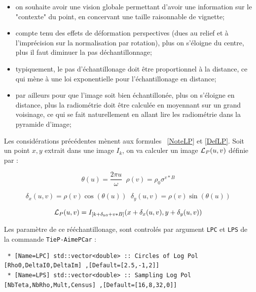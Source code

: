 \begin{itemize}
   \item on souhaite avoir une vision globale permettant d'avoir une information sur le "contexte"  du 
         point, en concervant une taille raisonnable de  vignette;

   \item compte tenu des effets de d\'eformation perspectives (dues au relief et \`a l'impr\'ecision sur la
         normalisation par rotation), plus on s'\'eloigne du centre, plus il faut diminuer la pas d\'echantillonnage;

   \item typiquement, le pas d'\'echantillonage doit \^etre  proportionnel \`a la distance, ce qui m\`ene
         \`a une loi exponentielle pour l'\'echantillonage en distance;

   \item par ailleurs pour que l'image soit bien \'echantillon\'ee, plus on s'\'eloigne en distance, plus la 
         radiom\'etrie doit \^etre calcul\'ee en moyennant sur un grand voisinage, ce qui se fait naturellement
         en allant lire les radiom\'etrie dans la pyramide d'image;
\end{itemize}


Les consid\'erations pr\'ec\'edentes m\`enent aux formules  ~\ref{NoteLP} et  \ref{DefLP}.
Soit un point $x,y$ extrait dans une image $I_k$, on
va calculer un image ${\mathcal L_P}(u,v)$ d\'efinie par :


\begin{equation}
    \theta(u) = \frac{2\pi u}{\omega} \;\; \rho(v)= \rho_0 \sigma^{v*B} \label{NoteLP}
\end{equation}

\begin{equation}
    \delta_x(u,v) =  \rho(v) \cos(\theta(u))  \; \;   \delta_y(u,v) =  \rho(v) \sin(\theta(u))  \label{XYLP}
\end{equation}

\begin{equation}
     {\mathcal L_P}(u,v) =   I_{[k+\delta_{k0}+v*B]}(x + \delta_x(u,v), y+\delta_y(u,v)) \label{DefLP}
\end{equation}


Les param\`etre de ce r\'e\'echantillonage, sont control\'es par  argument {\tt LPC} et {\tt LPS}
de la commande {\tt TieP-AimePCar} :

\begin{verbatim}
 * [Name=LPC] std::vector<double> :: Circles of Log Pol [Rho0,DeltaI0,DeltaIm] ,[Default=[2.5,-1,2]]
 * [Name=LPS] std::vector<double> :: Sampling Log Pol [NbTeta,NbRho,Mult,Census] ,[Default=[16,8,32,0]]
\end{verbatim}

